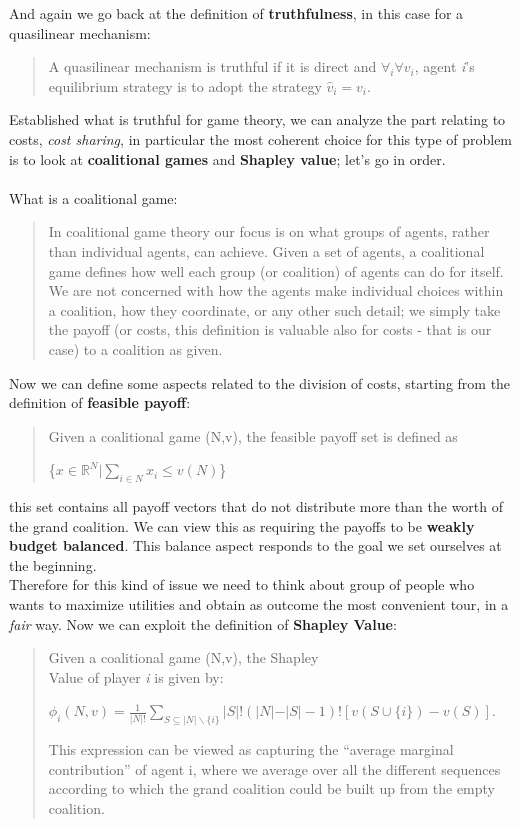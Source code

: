 \documentclass{article}
\begin{document}
{\begin{quote}
\end{quote}
And again we go back at the definition of \textbf{truthfulness}, in this case for a quasilinear mechanism:
\begin{quote}
    A quasilinear mechanism is truthful if it is direct and $\forall _i \forall v_i$, agent \textit{i}'s equilibrium strategy is to adopt the strategy $\hat{v}_i = v_i$.
\end{quote}
Established what is truthful for game theory, we can analyze the part relating to costs, \textit{cost sharing}, in particular the most coherent choice for this type of problem is to look at  \textbf{coalitional games} and \textbf{Shapley value}; let's go in order.\\\\
What is a coalitional game:
\begin{quote}
    In coalitional game theory our focus is on what groups of agents, rather than individual agents, can achieve. Given a set of agents, a coalitional game defines how well each group (or coalition) of agents can do for itself. We are not concerned with how the agents make individual choices within a coalition, how they coordinate, or any other such detail; we simply take the payoff (or costs, this definition is valuable also for costs - that is our case) to a coalition as given.
\end{quote}
Now we can define some aspects related to the division of costs, starting from the definition of \textbf{feasible payoff}:
\begin{quote}
    Given a coalitional game (N,v), the feasible payoff set is defined as 
    \begin{center}
        \{$x \in \mathbb{R}^N \vert \sum_{i\in N} x_i \le v(N)$\}
    \end{center}
\end{quote}
this set contains all payoff vectors that do not distribute more than the worth of the grand coalition. We can view this as requiring the payoffs to be \textbf{weakly budget balanced}. This balance aspect responds to the goal we set ourselves at the beginning.
\\Therefore for this kind of issue we need to think about group of people who wants to maximize utilities and obtain as outcome the most convenient tour, in a \textit{fair} way. Now we can exploit the definition of \textbf{Shapley Value}:
\begin{quote}
    Given a coalitional game (N,v), the Shapley \\Value of player \textit{i} is given by:
    \begin{center}
    \normalsize{
        $\phi_i(N,v) = \frac{1}{\vert N \vert !} \displaystyle \sum_{S \subseteq \vert N \vert \backslash \{i\}} \vert S \vert!(\vert N \vert -  \vert S \vert - 1)! [v(S \cup \{i\}) - v(S)]$.
    }
    \end{center}
    This expression can be viewed as capturing the “average marginal contribution” of agent i, where we average over all the different sequences according to which the grand coalition could be built up from the empty coalition.
\end{quote}
}
\end{document}
